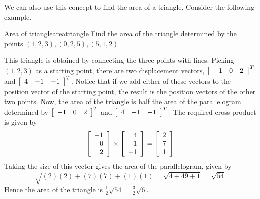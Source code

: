 We can also use this concept to find the area of a triangle. Consider the following
example.

\begin{example}{Area of triangle}{areatriangle}
Find the area of the triangle determined by the points $\left(1, 2, 3 \right) ,
\left( 0,2,5\right),
\left( 5,1, 2 \right) $ 
\end{example}

\begin{solution}
This triangle is obtained by connecting the three points with lines. Picking
$\left( 1,2,3\right) $ as a starting point, there are two displacement
vectors, $\left[ 
\begin{array}{rrr}
-1 & 0 & 2
\end{array}
\right]^T $ and $\left[ 
\begin{array}{rrr}
4 & -1 & -1
\end{array}
\right]^T $. Notice that if we add either of these vectors to the position vector of the 
starting point, the result is the position vectors of the other two
points. Now, the area of the triangle is half the area of the parallelogram
determined by $\left[ 
\begin{array}{rrr}
-1 & 0 & 2
\end{array}
\right]^T $ and $\left[ 
\begin{array}{rrr}
4 & -1 & -1
\end{array}
\right]^T.$ 
The required cross product is given by
\begin{equation*}
\left[ 
\begin{array}{r}
-1 \\
0 \\
2
\end{array}
\right] \times \left[ 
\begin{array}{r}
4 \\
-1 \\
-1
\end{array}
\right] = \left[
\begin{array}{rrr}
2 \\ 7 \\ 1
\end{array}
\right] 
\end{equation*}
  Taking the size of this vector gives the area of the parallelogram,
given by 
\begin{equation*}
\sqrt{(2)(2) + (7)(7) + (1)(1)}
=
\sqrt{4+49+1}
= \sqrt{54}
\end{equation*}
Hence the area of the triangle is $\frac{1}{2}\sqrt{54}= \frac{3}{2}\sqrt{6}.$
\end{solution}


